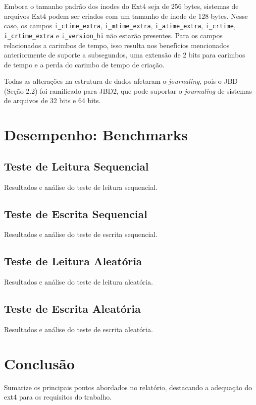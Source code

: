 \documentclass[
	12pt,				%
	openright,			%
	oneside,			%
	a4paper,			%
	chapter=TITLE,		%
	english,			%
	french,				%
	spanish,			%
	brazil				%
	]{abntex2}
\theoremstyle{definition}
\begin{document}
Embora o tamanho padrão dos inodes do Ext4 seja de 256 bytes, sistemas de 
arquivos Ext4 podem ser criados com um tamanho de inode de 128 bytes. Nesse caso, os campos 
\texttt{i\_ctime\_extra}, \texttt{i\_mtime\_extra}, \texttt{i\_atime\_extra}, \texttt{i\_crtime}, 
\texttt{i\_crtime\_extra} e \texttt{i\_version\_hi} não estarão presentes. Para os campos 
relacionados a carimbos de tempo, isso resulta nos benefícios mencionados anteriormente de 
suporte a subsegundos, uma extensão de 2 bits para carimbos de tempo e a perda do carimbo de tempo de criação.

Todas as alterações na estrutura de dados afetaram o \textit{journaling}, pois o JBD (Seção 2.2) 
foi ramificado para JBD2, que pode suportar o \textit{journaling} de sistemas de arquivos de 32 bits e 64 bits.

\chapter{Desempenho: Benchmarks}

\section{Teste de Leitura Sequencial}
Resultados e análise do teste de leitura sequencial.

\section{Teste de Escrita Sequencial}
Resultados e análise do teste de escrita sequencial.

\section{Teste de Leitura Aleatória}
Resultados e análise do teste de leitura aleatória.

\section{Teste de Escrita Aleatória}
Resultados e análise do teste de escrita aleatória.

\chapter{Conclusão}
Sumarize os principais pontos abordados no relatório, destacando a adequação do ext4 para os requisitos do trabalho.

\postextual



\cite{FAIRBANKS2012S118}
\cite{bovet_cesati_2005}
\cite{Tso}
\cite{matur}
\cite{kumar}
\end{document}
